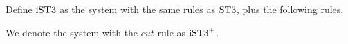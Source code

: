 \begin{dfn}
  Define $\istt$ as the system with the same rules as $\stt$, plus the following rules.
  \begin{multicols}{2}
    \begin{prooftree}
    \end{prooftree}
    \columnbreak
    \begin{prooftree}
    \end{prooftree}
  \end{multicols}
\end{dfn}

We denote the system with the $cut$ rule as $\istt^+$.